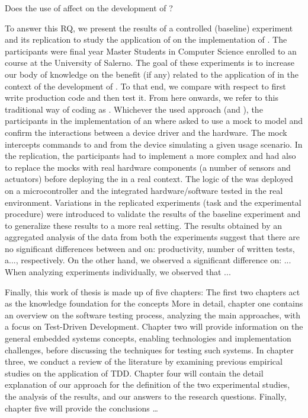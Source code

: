     \noindent
    Does the use of \tdd affect on the development of \ess?	

To answer this RQ, we present the results of a controlled (baseline) experiment and its replication to study the application of \tdd on the implementation of \ess. The participants were final year Master Students in Computer Science enrolled to an \es course at the University of Salerno. The goal of these experiments is to increase our body of knowledge on the benefit (if any) related to the application of \tdd in the context of the development of \ess. To that end, we compare \tdd with respect to first write production code and then test it. From here onwards, we refer to this traditional way of coding as \notdd. Whichever the used approach (\tdd and \notdd), the participants in the implementation of an \es  where asked to use a mock to model and confirm the interactions between a device driver and the hardware. The mock intercepts commands to and from the device simulating a given usage scenario. In the replication, the participants had to implement a more complex \es and had also to replace the mocks with real hardware components (a number of sensors and actuators) before deploying the \es in a real context. The logic of the \es was deployed on a microcontroller and the integrated hardware/software tested in the real environment. Variations in the replicated experiments (task and the experimental procedure) were introduced to validate the results of the baseline experiment and to generalize these results to a more real setting. The results obtained by an aggregated analysis of the data from both the experiments suggest that there are no significant differences between \tdd and \yw on: productivity, number of written tests, a..., respectively. On the other hand, we observed a significant difference on: ... When analyzing experiments individually, we observed that ...


Finally, this work of thesis is made up of five chapters:
The first two chapters act as the knowledge foundation for the concepts 
More in detail, chapter one contains an overview on the software testing process, analyzing the main approaches, with a focus on Test-Driven Development.
Chapter two will provide information on the general embedded systems concepts, enabling technologies and implementation challenges, before discussing the techniques for testing such systems.
In chapter three, we conduct a review of the literature by examining previous empirical studies on the application of TDD.
Chapter four will contain the detail explanation of our approach for the definition of the two experimental studies, the analysis of the results, and our answers to the research questions.
Finally, chapter five will provide the conclusions \dots